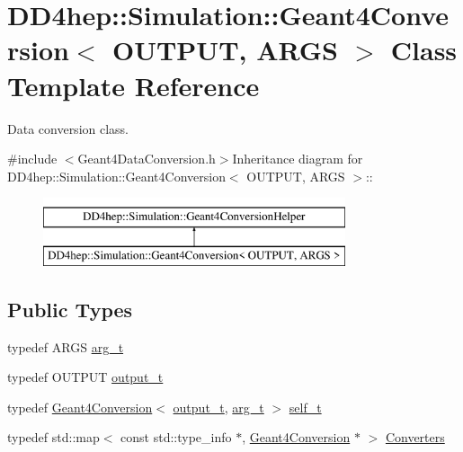 \hypertarget{class_d_d4hep_1_1_simulation_1_1_geant4_conversion}{
\section{DD4hep::Simulation::Geant4Conversion$<$ OUTPUT, ARGS $>$ Class Template Reference}
\label{class_d_d4hep_1_1_simulation_1_1_geant4_conversion}
}


Data conversion class.  


{\ttfamily \#include $<$Geant4DataConversion.h$>$}Inheritance diagram for DD4hep::Simulation::Geant4Conversion$<$ OUTPUT, ARGS $>$::\begin{figure}[H]
\begin{center}
\leavevmode
\includegraphics[height=2cm]{class_d_d4hep_1_1_simulation_1_1_geant4_conversion}
\end{center}
\end{figure}
\subsection*{Public Types}
\begin{DoxyCompactItemize}
\item 
typedef ARGS \hyperlink{class_d_d4hep_1_1_simulation_1_1_geant4_conversion_a2a9680db46d2a136982d290c9b11e6f8}{arg\_\-t}
\item 
typedef OUTPUT \hyperlink{class_d_d4hep_1_1_simulation_1_1_geant4_conversion_a9a6bd3ad991e9d1f61751201d4307d4a}{output\_\-t}
\item 
typedef \hyperlink{class_d_d4hep_1_1_simulation_1_1_geant4_conversion}{Geant4Conversion}$<$ \hyperlink{class_d_d4hep_1_1_simulation_1_1_geant4_conversion_a9a6bd3ad991e9d1f61751201d4307d4a}{output\_\-t}, \hyperlink{class_d_d4hep_1_1_simulation_1_1_geant4_conversion_a2a9680db46d2a136982d290c9b11e6f8}{arg\_\-t} $>$ \hyperlink{class_d_d4hep_1_1_simulation_1_1_geant4_conversion_ac48f71e223506f7c92f8358299ac5dfe}{self\_\-t}
\item 
typedef std::map$<$ const std::type\_\-info $\ast$, \hyperlink{class_d_d4hep_1_1_simulation_1_1_geant4_conversion}{Geant4Conversion} $\ast$ $>$ \hyperlink{class_d_d4hep_1_1_simulation_1_1_geant4_conversion_a1e6c074730135cc207cbd8d8030a189f}{Converters}
\end{DoxyCompactItemize}
